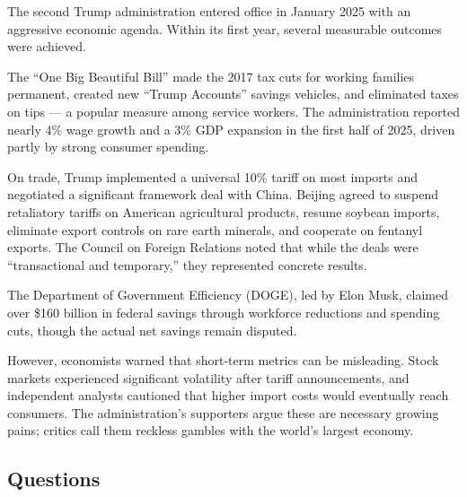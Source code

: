 \documentclass[10pt,a4paper]{article}
\begin{document}
\begin{tcolorbox}[colback=white, colframe=black]
\small
The second Trump administration entered office in January 2025 with
an aggressive economic agenda. Within its first year, several
measurable outcomes were achieved.

The ``One Big Beautiful Bill'' made the 2017 tax cuts for working
families permanent, created new ``Trump Accounts'' savings vehicles,
and eliminated taxes on tips --- a popular measure among service
workers. The administration reported nearly 4\% wage growth and a
3\% GDP expansion in the first half of 2025, driven partly by strong
consumer spending.

On trade, Trump implemented a universal 10\% tariff on most imports
and negotiated a significant framework deal with China. Beijing
agreed to suspend retaliatory tariffs on American agricultural
products, resume soybean imports, eliminate export controls on rare
earth minerals, and cooperate on fentanyl exports. The Council on
Foreign Relations noted that while the deals were ``transactional
and temporary,'' they represented concrete results.

The Department of Government Efficiency (DOGE), led by Elon Musk,
claimed over \$160 billion in federal savings through workforce
reductions and spending cuts, though the actual net savings remain
disputed.

However, economists warned that short-term metrics can be misleading.
Stock markets experienced significant volatility after tariff
announcements, and independent analysts cautioned that higher import
costs would eventually reach consumers. The administration's
supporters argue these are necessary growing pains; critics call
them reckless gambles with the world's largest economy.
\end{tcolorbox}

\subsection*{Questions}
\end{document}

